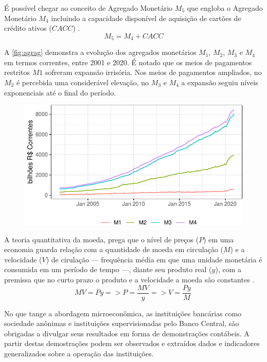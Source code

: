 \documentclass[12pt,12pt,openright,oneside,a4paper,chapter=TITLE,section=TITLE,subsection=TITLE,subsubsection=TITLE,english,french,spanish,portugues,sumario=tradicional]{abntex2}
\begin{document}
É possível chegar ao conceito de Agregado Monetário \(M_5\) que engloba o Agregado Monetário \(M_4\) incluindo a capacidade disponível de aquisição de cartões de crédito ativos (\(CACC\)) \cite{cordoba:1996}.
\[
M_5 = M_4 + CACC
\]

A \autoref{fig:agrag} demonstra a evolução dos agregados monetários \(M_1\), \(M_2\), \(M_3\) e \(M_4\) em termos correntes, entre 2001 e 2020. É notado que os meios de pagamentos restritos \(M1\) sofreram expansão irrisória. Nos meios de pagamentos ampliados, no \(M_2\) é percebida uma considerável elevação, no \(M_3\) e \(M_4\) a expansão seguiu níveis exponenciais até o final do período.

\begin{figure}

\begin{center}\includegraphics{12-exportedfigures/m2m3m4-1} \end{center}
\label{fig:agrag}
\end{figure}

A teoria quantitativa da moeda, prega que o nível de preços (\(P\)) em uma economia guarda relação com a quantidade de moeda em circulação (\(M\)) e a velocidade (\(V\)) de cirulação --- frequência média em que uma unidade monetária é consumida em um período de tempo ---, diante seu produto real (\(y\)), com a premissa que no curto prazo o produto e a velocidade a moeda são constantes \cite{vasconcellos:2011}.
\[
MV = Py => P = \frac{MV}{y} => V = \frac{Py}{M}\
\]

No que tange a abordagem microeconômica, as instituições bancárias como sociedade anônimas e instituições supervisionadas pelo Banco Central, são obrigadas a divulgar seus resultados em forma de demonstrações contábeis. A partir destas demostrações podem ser observados e extraídos dados e indicadores generalizados sobre a operação das instituições.
\end{document}
